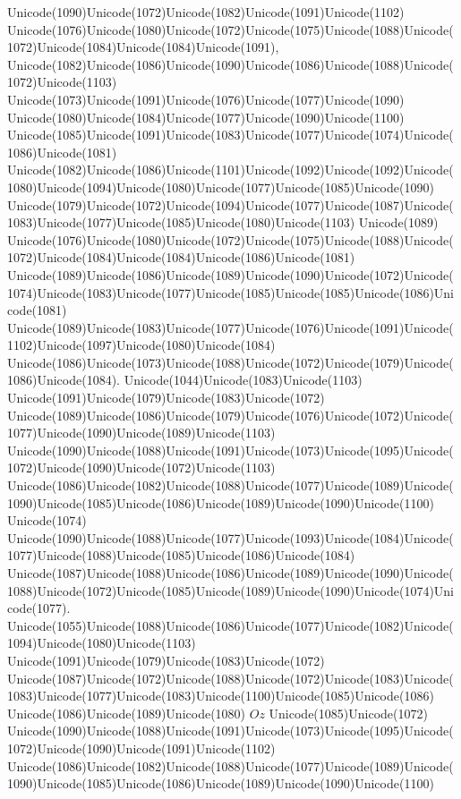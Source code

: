 \documentclass[a4paper,11pt]{report}
\begin{document}
{{{Unicode(1090)Unicode(1072)Unicode(1082)Unicode(1091)Unicode(1102)
Unicode(1076)Unicode(1080)Unicode(1072)Unicode(1075)Unicode(1088)Unicode(1072)Unicode(1084)Unicode(1084)Unicode(1091),
Unicode(1082)Unicode(1086)Unicode(1090)Unicode(1086)Unicode(1088)Unicode(1072)Unicode(1103)
Unicode(1073)Unicode(1091)Unicode(1076)Unicode(1077)Unicode(1090)
Unicode(1080)Unicode(1084)Unicode(1077)Unicode(1090)Unicode(1100)
Unicode(1085)Unicode(1091)Unicode(1083)Unicode(1077)Unicode(1074)Unicode(1086)Unicode(1081)
Unicode(1082)Unicode(1086)Unicode(1101)Unicode(1092)Unicode(1092)Unicode(1080)Unicode(1094)Unicode(1080)Unicode(1077)Unicode(1085)Unicode(1090)
Unicode(1079)Unicode(1072)Unicode(1094)Unicode(1077)Unicode(1087)Unicode(1083)Unicode(1077)Unicode(1085)Unicode(1080)Unicode(1103)
Unicode(1089)
Unicode(1076)Unicode(1080)Unicode(1072)Unicode(1075)Unicode(1088)Unicode(1072)Unicode(1084)Unicode(1084)Unicode(1086)Unicode(1081)
Unicode(1089)Unicode(1086)Unicode(1089)Unicode(1090)Unicode(1072)Unicode(1074)Unicode(1083)Unicode(1077)Unicode(1085)Unicode(1085)Unicode(1086)Unicode(1081)
Unicode(1089)Unicode(1083)Unicode(1077)Unicode(1076)Unicode(1091)Unicode(1102)Unicode(1097)Unicode(1080)Unicode(1084)
Unicode(1086)Unicode(1073)Unicode(1088)Unicode(1072)Unicode(1079)Unicode(1086)Unicode(1084).
Unicode(1044)Unicode(1083)Unicode(1103)
Unicode(1091)Unicode(1079)Unicode(1083)Unicode(1072)
Unicode(1089)Unicode(1086)Unicode(1079)Unicode(1076)Unicode(1072)Unicode(1077)Unicode(1090)Unicode(1089)Unicode(1103)
Unicode(1090)Unicode(1088)Unicode(1091)Unicode(1073)Unicode(1095)Unicode(1072)Unicode(1090)Unicode(1072)Unicode(1103)
Unicode(1086)Unicode(1082)Unicode(1088)Unicode(1077)Unicode(1089)Unicode(1090)Unicode(1085)Unicode(1086)Unicode(1089)Unicode(1090)Unicode(1100)
Unicode(1074)
Unicode(1090)Unicode(1088)Unicode(1077)Unicode(1093)Unicode(1084)Unicode(1077)Unicode(1088)Unicode(1085)Unicode(1086)Unicode(1084)
Unicode(1087)Unicode(1088)Unicode(1086)Unicode(1089)Unicode(1090)Unicode(1088)Unicode(1072)Unicode(1085)Unicode(1089)Unicode(1090)Unicode(1074)Unicode(1077).
Unicode(1055)Unicode(1088)Unicode(1086)Unicode(1077)Unicode(1082)Unicode(1094)Unicode(1080)Unicode(1103)
Unicode(1091)Unicode(1079)Unicode(1083)Unicode(1072)
Unicode(1087)Unicode(1072)Unicode(1088)Unicode(1072)Unicode(1083)Unicode(1083)Unicode(1077)Unicode(1083)Unicode(1100)Unicode(1085)Unicode(1086)
Unicode(1086)Unicode(1089)Unicode(1080) $Oz$ Unicode(1085)Unicode(1072)
Unicode(1090)Unicode(1088)Unicode(1091)Unicode(1073)Unicode(1095)Unicode(1072)Unicode(1090)Unicode(1091)Unicode(1102)
Unicode(1086)Unicode(1082)Unicode(1088)Unicode(1077)Unicode(1089)Unicode(1090)Unicode(1085)Unicode(1086)Unicode(1089)Unicode(1090)Unicode(1100)
}}}
\end{document}

